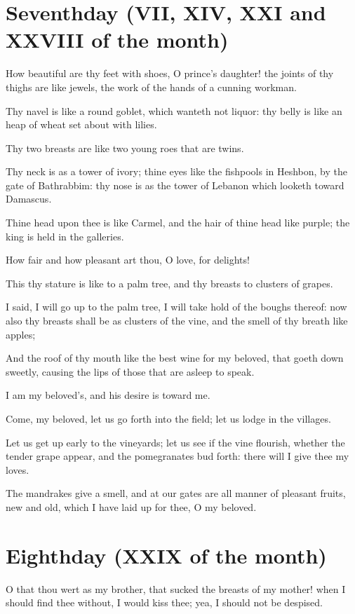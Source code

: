 \section{Seventhday (VII, XIV, XXI and XXVIII of the month)}

How beautiful are thy feet with shoes, O prince's daughter! the joints of thy thighs are like jewels, the work of the hands of a cunning workman.

Thy navel is like a round goblet, which wanteth not liquor: thy belly is like an heap of wheat set about with lilies.

Thy two breasts are like two young roes that are twins.

Thy neck is as a tower of ivory; thine eyes like the fishpools in Heshbon, by the gate of Bathrabbim: thy nose is as the tower of Lebanon which looketh toward Damascus.

Thine head upon thee is like Carmel, and the hair of thine head like purple; the king is held in the galleries.

How fair and how pleasant art thou, O love, for delights!

This thy stature is like to a palm tree, and thy breasts to clusters of grapes.

I said, I will go up to the palm tree, I will take hold of the boughs thereof: now also thy breasts shall be as clusters of the vine, and the smell of thy breath like apples;

And the roof of thy mouth like the best wine for my beloved, that goeth down sweetly, causing the lips of those that are asleep to speak.

I am my beloved's, and his desire is toward me.

Come, my beloved, let us go forth into the field; let us lodge in the villages.

Let us get up early to the vineyards; let us see if the vine flourish, whether the tender grape appear, and the pomegranates bud forth: there will I give thee my loves.

The mandrakes give a smell, and at our gates are all manner of pleasant fruits, new and old, which I have laid up for thee, O my beloved.

\section{Eighthday (XXIX of the month)}

O that thou wert as my brother, that sucked the breasts of my mother! when I should find thee without, I would kiss thee; yea, I should not be despised.

